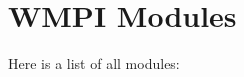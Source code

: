 \section{WMPI Modules}
Here is a list of all modules:\begin{CompactList}
\item {}
\end{CompactList}
